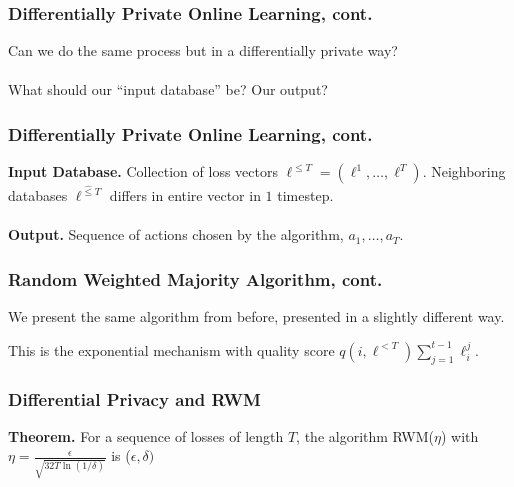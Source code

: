 \documentclass[aspectratio=169]{beamer}
\begin{document}
\begin{frame}
\frametitle{Differentially Private Online Learning, cont.}

Can we do the same process but in a differentially private way?\\~\\

What should our ``input database'' be? Our output?
\end{frame}

\begin{frame}
\frametitle{Differentially Private Online Learning, cont.}
\textbf{Input Database.} Collection of loss vectors $\ell^{\leq T} = (\ell^1, \dots, \ell^T)$. Neighboring databases $\ell^{\hat{\leq}T}$ differs in entire vector in $1$ timestep.\\~\\

\textbf{Output.} Sequence of actions chosen by the algorithm, $a_1,\dots, a_T$.
\end{frame}

\begin{frame}
\frametitle{Random Weighted Majority Algorithm, cont.}

We present the same algorithm from before, presented in a slightly different way.

\begin{algorithm}[H]
\begin{algorithmic}
  \EndFor
  \EndProcedure
\end{algorithmic}
\end{algorithm}

This is the exponential mechanism with quality score $q(i, \ell^{< T}) \sum_{j=1}^{t-1} \ell_i^j$.
\end{frame}

\begin{frame}
\frametitle{Differential Privacy and RWM}

\textbf{Theorem.} For a sequence of losses of length $T$, the algorithm RWM($\eta$) with $\eta = \frac{\epsilon}{\sqrt{32 T \ln(1/\delta)}}$ is ($\epsilon, \delta)$
\end{frame}
\end{document}

